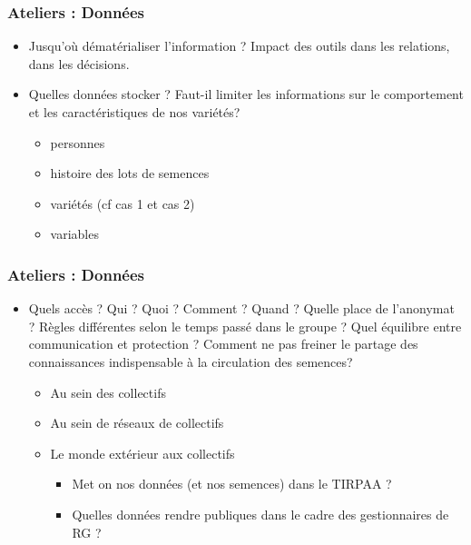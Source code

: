 \begin{frame}
\frametitle{Ateliers : Données}

\begin{itemize}

\item Jusqu'où dématérialiser l'information ? Impact des outils dans les relations, dans les décisions.

\vfill

\item Quelles données stocker ?
Faut-il limiter les informations sur le comportement et les caractéristiques de nos variétés? 
	\begin{itemize}
	\item personnes
	\item histoire des lots de semences
	\item variétés (cf cas 1 et cas 2)
	\item variables		
	\end{itemize}

\end{itemize}

\end{frame}

\begin{frame}
\frametitle{Ateliers : Données}

\begin{itemize}

\item Quels accès ?
Qui ? Quoi ? Comment ? Quand ? Quelle place de l’anonymat ? Règles différentes selon le temps passé dans le groupe ? Quel équilibre entre communication et protection ?
Comment ne pas freiner le partage des connaissances indispensable à la circulation des semences? 
	\begin{itemize}
	\item Au sein des collectifs
	\item Au sein de réseaux de collectifs
	\item Le monde extérieur aux collectifs
		\begin{itemize}
		\item Met on nos données (et nos semences) dans le TIRPAA ?
		\item Quelles données rendre publiques dans le cadre des gestionnaires de RG ?
		\end{itemize}
	\end{itemize}
\end{itemize}

\end{frame}


